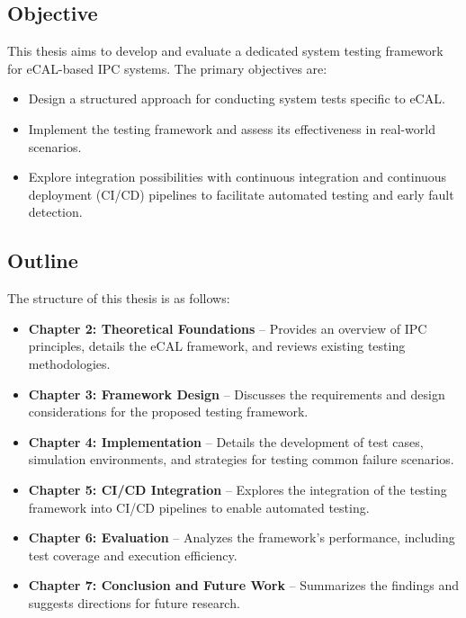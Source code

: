 \clearpage

\subsection{Objective}

This thesis aims to develop and evaluate a dedicated system testing framework for eCAL-based IPC systems. The primary objectives are:

\begin{itemize}
	\item Design a structured approach for conducting system tests specific to eCAL.
	\item Implement the testing framework and assess its effectiveness in real-world scenarios.
	\item Explore integration possibilities with continuous integration and continuous deployment (CI/CD) pipelines to facilitate automated testing and early fault detection.
\end{itemize}

\subsection{Outline}

The structure of this thesis is as follows:

\begin{itemize}
	\item \textbf{Chapter 2: Theoretical Foundations} – Provides an overview of IPC principles, details the eCAL framework, and reviews existing testing methodologies.
	\item \textbf{Chapter 3: Framework Design} – Discusses the requirements and design considerations for the proposed testing framework.
	\item \textbf{Chapter 4: Implementation} – Details the development of test cases, simulation environments, and strategies for testing common failure scenarios.
	\item \textbf{Chapter 5: CI/CD Integration} – Explores the integration of the testing framework into CI/CD pipelines to enable automated testing.
	\item \textbf{Chapter 6: Evaluation} – Analyzes the framework's performance, including test coverage and execution efficiency.
	\item \textbf{Chapter 7: Conclusion and Future Work} – Summarizes the findings and suggests directions for future research.
\end{itemize}






